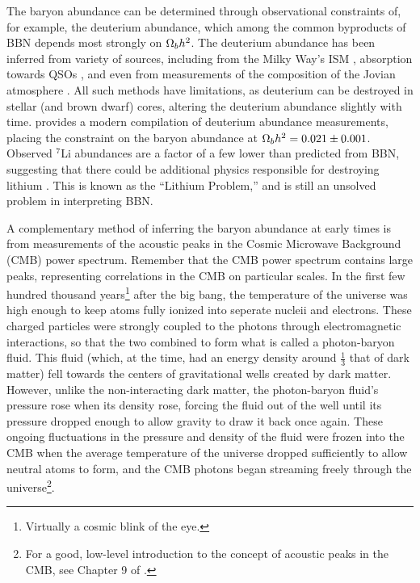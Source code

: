 The baryon abundance can be determined through observational
constraints of, for example, the deuterium abundance, which among the
common byproducts of BBN depends most strongly on $\Omega_b h^2$. The
deuterium abundance has been inferred from variety of sources,
including from the Milky Way's ISM \citep{Linsky1993, Linsky1995},
absorption towards QSOs \citep{Tytler1996, Kirkman2003}, and even from
measurements of the composition of the Jovian atmosphere
\citep{Niemann1996}. All such methods have limitations, as deuterium
can be destroyed in stellar (and brown dwarf) cores, altering the
deuterium abundance slightly with time. \citet{Iocco2009} provides a
modern compilation of deuterium abundance measurements, placing the
constraint on the baryon abundance at $\Omega_b h^2 = 0.021 \pm
0.001$. Observed $^7$Li abundances are a factor of a few lower than
predicted from BBN, suggesting that there could be additional physics
responsible for destroying lithium \citep{Suzuki2000,
  Melendez2004}. This is known as the ``Lithium Problem,'' and is
still an unsolved problem in interpreting BBN.

A complementary method of inferring the baryon abundance at early
times is from measurements of the acoustic peaks in the Cosmic
Microwave Background (CMB) power spectrum. Remember that the CMB power
spectrum contains large peaks, representing correlations in the CMB on
particular scales. In the first few hundred thousand
years\footnote{Virtually a cosmic blink of the eye.} after the big
bang, the temperature of the universe was high enough to keep atoms
fully ionized into seperate nucleii and electrons. These charged
particles were strongly coupled to the photons through electromagnetic
interactions, so that the two combined to form what is called a
photon-baryon fluid. This fluid (which, at the time, had an energy
density around $\frac{1}{3}$ that of dark matter) fell towards the
centers of gravitational wells created by dark matter. However, unlike
the non-interacting dark matter, the photon-baryon fluid's pressure
rose when its density rose, forcing the fluid out of the well
until its pressure dropped enough to allow gravity to draw it back
once again. These ongoing fluctuations in the pressure and density
of the fluid were frozen into the CMB when the average temperature of
the universe dropped sufficiently to allow neutral atoms to form, and
the CMB photons began streaming freely through the
universe\footnote{For a good, low-level introduction to the concept of
  acoustic peaks in the CMB, see Chapter 9 of \citet{Ryden2003}.}.

